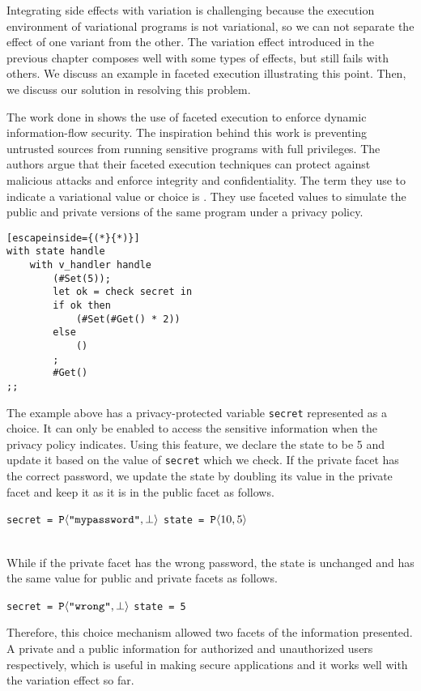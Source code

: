 Integrating side effects with variation is challenging because the execution environment of variational programs is not variational, so we can not separate the effect of one variant from the other. 
The variation effect introduced in the previous chapter composes well with some types of effects, but still fails with others. We discuss an example in faceted execution illustrating this point. Then, we discuss our solution in resolving this problem.

The work done in \cite{Austin14} shows the use of faceted execution to enforce dynamic information-flow security. The inspiration behind this work is preventing untrusted sources from running sensitive programs with full privileges. The authors argue that their faceted execution techniques can protect against malicious attacks and enforce integrity and confidentiality. The term they use to indicate a variational value or choice is . They use faceted values to simulate the public and private versions of the same program under a privacy policy.

\begin{lstlisting}[escapeinside={(*}{*)}]
with state handle
    with v_handler handle
        (#Set(5));
        let ok = check secret in
    	if ok then 
            (#Set(#Get() * 2))
    	else
            ()
        ;
        #Get()
;;
\end{lstlisting}

The example above has a privacy-protected variable \texttt{secret} represented as a choice. It can only be enabled to access the sensitive information when the privacy policy indicates. Using this feature, we declare the state to be 5 and update it based on the value of \texttt{secret} which we check. If the private facet has the correct password, we update the state by doubling its value in the private facet and keep it as it is in the public facet as follows. \\
\centerline{\texttt {secret = $ \Chc [\texttt{P}]{\texttt{"mypassword"}} {\bot}$} \quad \texttt {state = $ \Chc [\texttt{P}]{10} {5} $} }\\
%
While if the private facet has the wrong password, the state is unchanged and has the same value for public and private facets as follows. \\
\centerline{\texttt {secret = $ \Chc [\texttt{P}]{\texttt{"wrong"}} {\bot} $} \quad \texttt {state = 5}}
%
Therefore, this choice mechanism allowed two facets of the information presented. A private and a public information for authorized and unauthorized users respectively, which is useful in making secure applications and it works well with the variation effect so far. 


